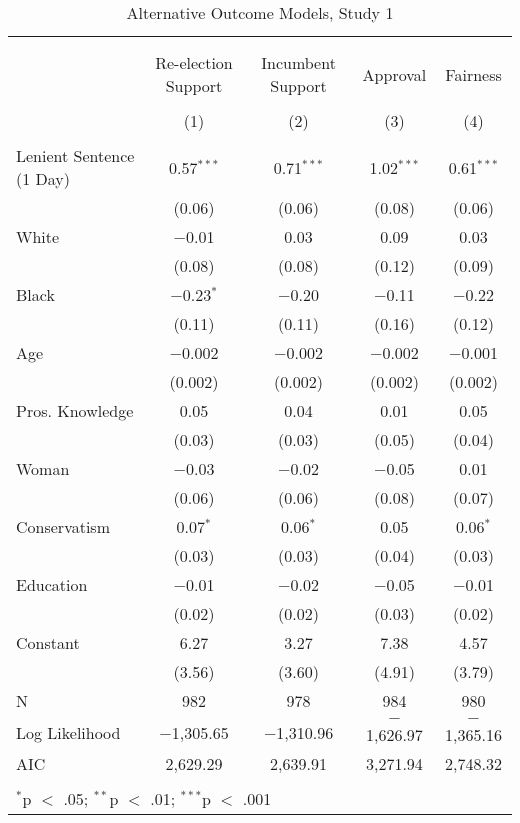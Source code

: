 \documentclass[12pt,letterpaper]{article}
\begin{document}
\begin{table}[!htbp] \centering   \caption{Alternative Outcome Models, Study 1}   \label{} \begin{tabular}{@{\extracolsep{5pt}}lcccc} \\[-1.8ex]\hline \\[-1.8ex] \\[-1.8ex] & Re-election Support & Incumbent Support & Approval & Fairness \\ \\[-1.8ex] & (1) & (2) & (3) & (4)\\ \hline \\[-1.8ex]  Lenient Sentence (1 Day) & 0.57$^{***}$ & 0.71$^{***}$ & 1.02$^{***}$ & 0.61$^{***}$ \\   & (0.06) & (0.06) & (0.08) & (0.06) \\   White & $-$0.01 & 0.03 & 0.09 & 0.03 \\   & (0.08) & (0.08) & (0.12) & (0.09) \\   Black & $-$0.23$^{*}$ & $-$0.20 & $-$0.11 & $-$0.22 \\   & (0.11) & (0.11) & (0.16) & (0.12) \\   Age & $-$0.002 & $-$0.002 & $-$0.002 & $-$0.001 \\   & (0.002) & (0.002) & (0.002) & (0.002) \\   Pros. Knowledge & 0.05 & 0.04 & 0.01 & 0.05 \\   & (0.03) & (0.03) & (0.05) & (0.04) \\   Woman & $-$0.03 & $-$0.02 & $-$0.05 & 0.01 \\   & (0.06) & (0.06) & (0.08) & (0.07) \\   Conservatism & 0.07$^{*}$ & 0.06$^{*}$ & 0.05 & 0.06$^{*}$ \\   & (0.03) & (0.03) & (0.04) & (0.03) \\   Education & $-$0.01 & $-$0.02 & $-$0.05 & $-$0.01 \\   & (0.02) & (0.02) & (0.03) & (0.02) \\   Constant & 6.27 & 3.27 & 7.38 & 4.57 \\   & (3.56) & (3.60) & (4.91) & (3.79) \\  N & 982 & 978 & 984 & 980 \\ Log Likelihood & $-$1,305.65 & $-$1,310.96 & $-$1,626.97 & $-$1,365.16 \\ AIC & 2,629.29 & 2,639.91 & 3,271.94 & 2,748.32 \\ \hline \\[-1.8ex] \multicolumn{5}{l}{$^{*}$p $<$ .05; $^{**}$p $<$ .01; $^{***}$p $<$ .001} \\ \end{tabular} \end{table} 


	
\end{document}
